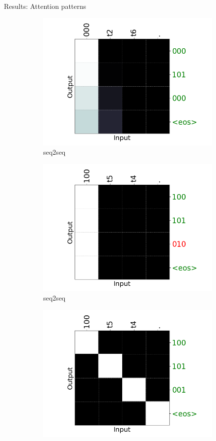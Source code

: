 \documentclass[final,hyperref={pdfpagelabels=false}]{beamer}
\begin{document}
\begin{frame}[t]
\begin{columns}[t]
\begin{column}{.465\textwidth}
\begin{block}{Results: Attention patterns}
\begin{figure}
    \centering
	\begin{subfigure}{.33\linewidth}
		\centering
		\includegraphics[width=0.80\linewidth,trim={2cm 0cm 1cm 0cm},clip]{Figures/attn_baseline_lookup_distributed}
		\caption{seq2seq}
		\label{fig:attn_baseline_lookup_heldout_input1}
	\end{subfigure}%
	\begin{subfigure}{.33\linewidth}
		\centering
		\includegraphics[width=0.80\linewidth,trim={2cm 0cm 1cm 0cm},clip]{Figures/attn_baseline_lookup_sparse}
		\caption{seq2seq}
		\label{fig:attn_baseline_lookup_heldout_input2}
	\end{subfigure}%
	\begin{subfigure}{.33\linewidth}
		\centering
		\includegraphics[width=0.80\linewidth,trim={2cm 0cm 1cm 0cm},clip]{Figures/attn_seq2attn_lookup}

\end{subfigure}
\end{figure}
\end{block}
\end{column}
\end{columns}
\end{frame}
\end{document}
